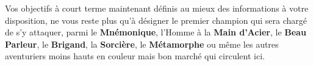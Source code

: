 \documentclass{report}
\begin{document}
Vos objectifs à court terme maintenant définis au mieux des informations à votre disposition, ne vous reste plus qu'à désigner le premier champion qui sera chargé de s'y attaquer, parmi le \textbf{Mnémonique}, l’Homme à la \textbf{Main d’Acier}, le \textbf{Beau Parleur}, le \textbf{Brigand}, la \textbf{Sorcière}, le \textbf{Métamorphe} ou même les autres aventuriers moins hauts en couleur mais bon marché qui circulent ici.
\end{document}
